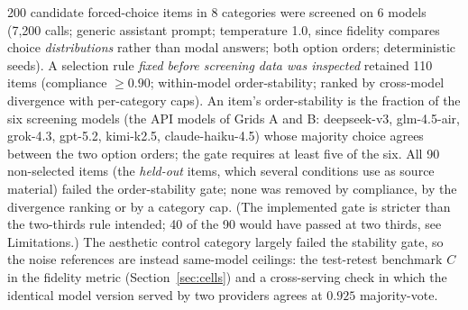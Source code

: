 \documentclass[11pt]{article}
\begin{document}
200 candidate forced-choice items in 8 categories were screened on 6 models
(7{,}200 calls; generic assistant prompt; temperature 1.0, since fidelity
compares choice \emph{distributions} rather than modal answers; both option
orders; deterministic seeds). A selection rule \emph{fixed before screening data
was inspected} retained 110 items (compliance $\ge 0.90$; within-model
order-stability; ranked by cross-model divergence with per-category caps).
An item's order-stability is the fraction of the six screening models (the
API models of Grids A and B: deepseek-v3, glm-4.5-air, grok-4.3, gpt-5.2,
kimi-k2.5, claude-haiku-4.5) whose majority choice agrees between the two
option orders; the gate requires at least five of the six. All 90
non-selected items (the \emph{held-out} items, which several conditions use
as source material) failed the order-stability gate; none was removed by
compliance, by the divergence ranking or by a category cap. (The implemented
gate is stricter than the two-thirds rule intended; 40 of the 90 would have
passed at two thirds, see Limitations.)
The aesthetic control category largely failed the stability gate, so the
noise references are instead same-model ceilings: the test-retest benchmark
$C$ in the fidelity metric (Section~\ref{sec:cells}) and a cross-serving
check in which the identical model version served by two providers agrees at
$0.925$ majority-vote.
\end{document}
